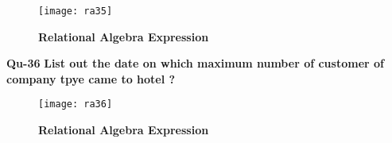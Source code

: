 \documentclass[a4,12pt]{report}
\begin{document}
\begin{figure}[hbtp]
\centering
\texttt{[image: ra35]}
\caption{\textbf{{\color{red}Relational Algebra Expression}}}
\end{figure}

\newpage
\textbf{Qu-36} \textbf{ List out the date on which maximum number of customer of company tpye came to hotel ? }\\

\begin{figure}[hbtp]
\centering
\texttt{[image: ra36]}
\caption{\textbf{{\color{red}Relational Algebra Expression}}}
\end{figure}
\end{document}
